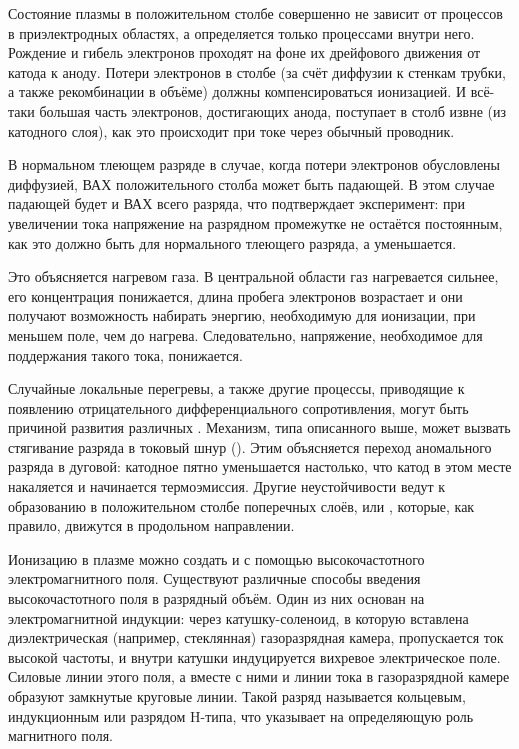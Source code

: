 Состояние плазмы в положительном столбе совершенно не зависит от процессов в приэлектродных областях, а определяется
только процессами внутри него. Рождение и гибель электронов проходят на фоне их дрейфового движения от катода к аноду.
Потери электронов в столбе (за счёт диффузии к стенкам трубки, а также рекомбинации в объёме) должны компенсироваться
ионизацией. И всё-таки большая часть электронов, достигающих анода, поступает в столб извне (из катодного слоя), как это
происходит при токе через обычный проводник.

В нормальном тлеющем разряде в случае, когда потери электронов обусловлены диффузией, ВАХ положительного столба может
быть падающей. В этом случае падающей будет и ВАХ всего разряда, что подтверждает эксперимент: при увеличении тока
напряжение на разрядном промежутке не остаётся постоянным, как это должно быть для нормального тлеющего разряда, а
уменьшается.

Это объясняется нагревом газа. В центральной области газ нагревается сильнее, его концентрация понижается, длина пробега
электронов возрастает и они получают возможность набирать энергию, необходимую для ионизации, при меньшем поле, чем до
нагрева. Следовательно, напряжение, необходимое для поддержания такого тока, понижается.

Случайные локальные перегревы, а также другие процессы, приводящие к появлению отрицательного дифференциального
сопротивления, могут быть причиной развития различных . Механизм, типа описанного выше, может
вызвать стягивание разряда в токовый шнур (). Этим объясняется переход аномального разряда в дуговой:
катодное пятно уменьшается настолько, что катод в этом месте накаляется и начинается термоэмиссия. Другие неустойчивости
ведут к образованию в положительном столбе поперечных слоёв, или , которые, как правило, движутся в
продольном направлении.


Ионизацию в плазме можно создать и с помощью высокочастотного электромагнитного поля. Существуют различные способы
введения высокочастотного поля в разрядный объём. Один из них основан на электромагнитной индукции: через
катушку-соленоид, в которую вставлена диэлектрическая (например, стеклянная) газоразрядная камера, пропускается ток
высокой частоты, и внутри катушки индуцируется вихревое электрическое поле. Силовые линии этого поля, а вместе с ними и
линии тока в газоразрядной камере образуют замкнутые круговые линии. Такой разряд называется кольцевым, индукционным или
разрядом H-типа, что указывает на определяющую роль магнитного поля.

